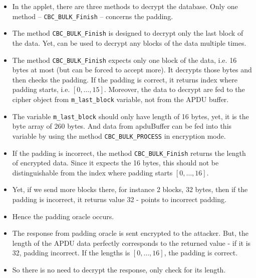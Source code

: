 \documentclass[11pt,a4paper]{article}
\begin{document}
\begin{itemize}
\item In the applet, there are three methods to decrypt the database. Only one method -- \texttt{CBC\_BULK\_Finish} -- concerns the padding.
\item The method \texttt{CBC\_BULK\_Finish} is designed to decrypt only the last block of the data. Yet, can be used to decrypt any blocks of the data multiple times.
\item The method \texttt{CBC\_BULK\_Finish} expects only one block of the data, i.e. 16 bytes at most (but can be forced to accept more). It decrypts those bytes and then checks the padding. If the padding is correct, it returns index where padding starts, i.e. $[0,\dots,15]$. Moreover, the data to decrypt are fed to the cipher object from \texttt{m\_last\_block} variable, not from the APDU buffer.
\item The variable \texttt{m\_last\_block} should only have length of 16 bytes, yet, it is the byte array of 260 bytes. And data from apduBuffer can be fed into this variable by using the method \texttt{CBC\_BULK\_PROCESS} in encryption mode.
\item If the padding is incorrect, the method \texttt{CBC\_BULK\_Finish} returns the length of encrypted data. Since it expects the 16 bytes, this should not be distinguishable from the index where padding starts $[0,\dots,16]$.
\item Yet, if we send more blocks there, for instance 2 blocks, 32 bytes, then if the padding is incorrect, it returns value 32 - points to incorrect padding.
\item Hence the padding oracle occurs.
\item The response from padding oracle is sent encrypted to the attacker. But, the length of the APDU data perfectly corresponds to the returned value - if it is 32, padding incorrect. If the lengths is $[0,\dots,16]$, the padding is correct.
\item So there is no need to decrypt the response, only check for its length.
\end{itemize}
\end{document}
